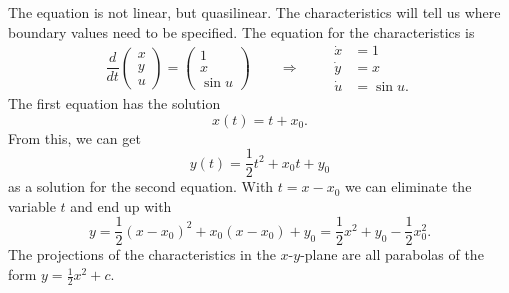 \begin{loesung}
The equation is not linear, but quasilinear.
The characteristics will tell us where boundary values need to be
specified.
The equation for the characteristics is
\begin{equation}
\frac{d}{dt}\begin{pmatrix}x\\y\\u\end{pmatrix}
=
\begin{pmatrix}
1\\x\\\sin u
\end{pmatrix}
\qquad
\Rightarrow
\qquad
\begin{aligned}
\dot x &= 1\\
\dot y &= x\\
\dot u &=\sin u.
\end{aligned}
\end{equation}
The first equation has the solution
\[
x(t) = t+x_0.
\]
From this, we can get
\[
y(t) = \frac12 t^2+x_0t+y_0
\]
as a solution for the second equation.
With $t=x-x_0$ we can eliminate the variable $t$ and end up with
\[
y=\frac12(x-x_0)^2+x_0(x-x_0)+y_0=\frac12x^2 + y_0-\frac12x_0^2.
\]
The projections of the characteristics in the $x$-$y$-plane are
all parabolas of the form $y=\frac12x^2+c$.


\end{loesung}
